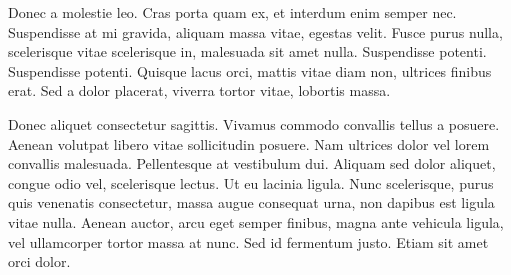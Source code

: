 Donec a molestie leo. Cras porta quam ex, et interdum enim semper nec. Suspendisse at mi gravida, aliquam massa vitae, egestas velit. Fusce purus nulla, scelerisque vitae scelerisque in, malesuada sit amet nulla. Suspendisse potenti. Suspendisse potenti. Quisque lacus orci, mattis vitae diam non, ultrices finibus erat. Sed a dolor placerat, viverra tortor vitae, lobortis massa.

Donec aliquet consectetur sagittis. Vivamus commodo convallis tellus a posuere. Aenean volutpat libero vitae sollicitudin posuere. Nam ultrices dolor vel lorem convallis malesuada. Pellentesque at vestibulum dui. Aliquam sed dolor aliquet, congue odio vel, scelerisque lectus. Ut eu lacinia ligula. Nunc scelerisque, purus quis venenatis consectetur, massa augue consequat urna, non dapibus est ligula vitae nulla. Aenean auctor, arcu eget semper finibus, magna ante vehicula ligula, vel ullamcorper tortor massa at nunc. Sed id fermentum justo. Etiam sit amet orci dolor.




\let\cleardoublepage\clearpage


